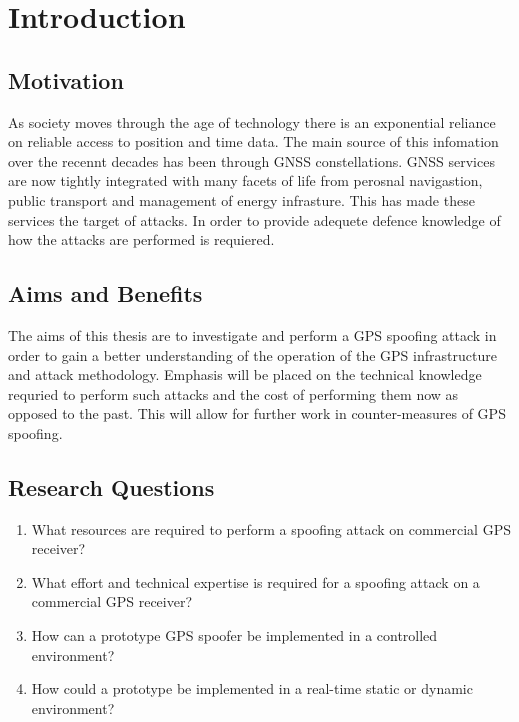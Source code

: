 
\chapter{Introduction}\label{chapter:firstchapter} %

\label{Chapter1} %

\section{Motivation}\label{sec:Motivation}


As society moves through the age of technology there is an exponential reliance on reliable access to position and time data. The main source of this infomation over the
recennt decades has been through GNSS constellations. GNSS services are now tightly integrated with many facets of life from perosnal navigastion, public transport and
management of
energy infrasture. This has made these services the target of attacks. In order to provide adequete defence knowledge of how the attacks are performed is requiered.

\section{Aims and Benefits}\label{sec:Aims}
The aims of this thesis are to investigate and perform a GPS spoofing attack in order to gain a better understanding of the operation of the GPS infrastructure and attack
methodology. Emphasis will be placed on the technical knowledge requried to perform such attacks and the cost of performing them now as opposed to the past. This will allow for further work in counter-measures of GPS spoofing.

\section{Research Questions}\label{sec:RQs}
\begin{enumerate}
    \item What resources are required to perform a spoofing attack on commercial GPS receiver?
    \item What effort and technical expertise is required for a spoofing attack on a commercial GPS receiver?
    \item How can a prototype GPS spoofer be implemented in a controlled environment?
    \item How could a prototype be implemented in a real-time static or dynamic environment? 
\end{enumerate}

